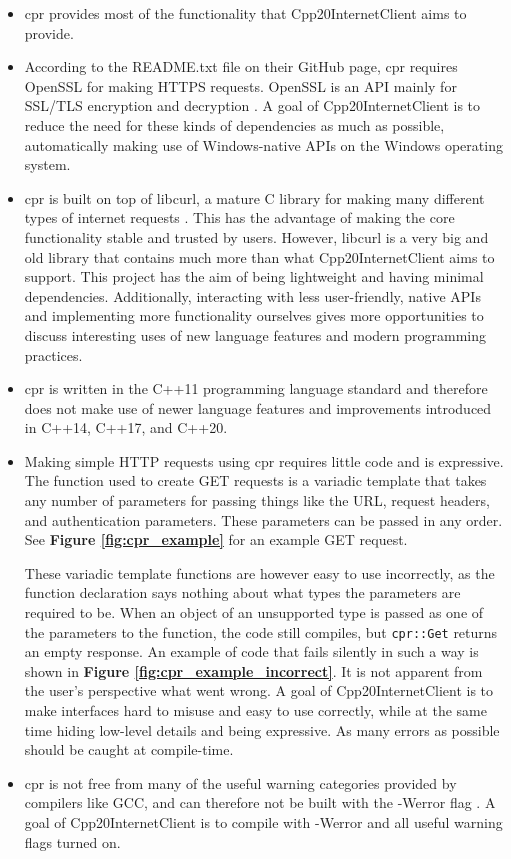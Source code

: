 \documentclass[12pt, a4paper]{article}
\begin{document}
\begin{itemize}
	\item cpr provides most of the functionality that Cpp20InternetClient aims to provide.
	\item According to the README.txt file on their GitHub page, cpr requires OpenSSL for making HTTPS requests. OpenSSL is an API mainly for SSL/TLS encryption and decryption \parencite{OpenSSL}. A goal of Cpp20InternetClient is to reduce the need for these kinds of dependencies as much as possible, automatically making use of Windows-native APIs on the Windows operating system. 
	\item cpr is built on top of libcurl, a mature C library for making many different types of internet requests \parencite{Libcurl}. This has the advantage of making the core functionality stable and trusted by users. However, libcurl is a very big and old library that contains much more than what Cpp20InternetClient aims to support. This project has the aim of being lightweight and having minimal dependencies. Additionally, interacting with less user-friendly, native APIs and implementing more functionality ourselves gives more opportunities to discuss interesting uses of new language features and modern programming practices.
	\item cpr is written in the C++11 programming language standard and therefore does not make use of newer language features and improvements introduced in C++14, C++17, and C++20.
	\item Making simple HTTP requests using cpr requires little code and is expressive. The function used to create GET requests is a variadic template that takes any number of parameters for passing things like the URL, request headers, and authentication parameters. These parameters can be passed in any order. See \textbf{Figure \ref{fig:cpr_example}} for an example GET request.

	These variadic template functions are however easy to use incorrectly, as the function declaration says nothing about what types the parameters are required to be. When an object of an unsupported type is passed as one of the parameters to the function, the code still compiles, but \texttt{cpr::Get} returns an empty response. An example of code that fails silently in such a way is shown in \textbf{Figure \ref{fig:cpr_example_incorrect}}. It is not apparent from the user’s perspective what went wrong. A goal of Cpp20InternetClient is to make interfaces hard to misuse and easy to use correctly, while at the same time hiding low-level details and being expressive. As many errors as possible should be caught at compile-time.
	\item cpr is not free from many of the useful warning categories provided by compilers like GCC, and can therefore not be built with the -Werror flag \parencite{GccWarnings}. A goal of Cpp20InternetClient is to compile with -Werror and all useful warning flags turned on.
\end{itemize}
\end{document}
